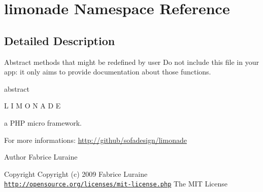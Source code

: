 \hypertarget{namespacelimonade}{
\section{\-l\-i\-m\-o\-n\-a\-d\-e \-N\-a\-m\-e\-s\-p\-a\-c\-e \-R\-e\-f\-e\-r\-e\-n\-c\-e}
\label{namespacelimonade}
}


\subsection{Detailed Description}
Abstract methods that might be redefined by user Do not include this file in your app: it only aims to provide documentation about those functions.

abstract

L I M O N A D E

a PHP micro framework.

For more informations: \hyperlink{}{\-h\-t\-t\-p\-:\-/\-/\-g\-i\-t\-h\-u\-b\-/\-s\-o\-f\-a\-d\-e\-s\-i\-g\-n\-/\-l\-i\-m\-o\-n\-a\-d\-e}

\begin{DoxyAuthor}{Author}
Fabrice Luraine 
\end{DoxyAuthor}
\begin{DoxyCopyright}{Copyright}
Copyright (c) 2009 Fabrice Luraine  \href{http://opensource.org/licenses/mit-license.php}{\tt http://opensource.org/licenses/mit-\/license.php} The MIT License 
\end{DoxyCopyright}
